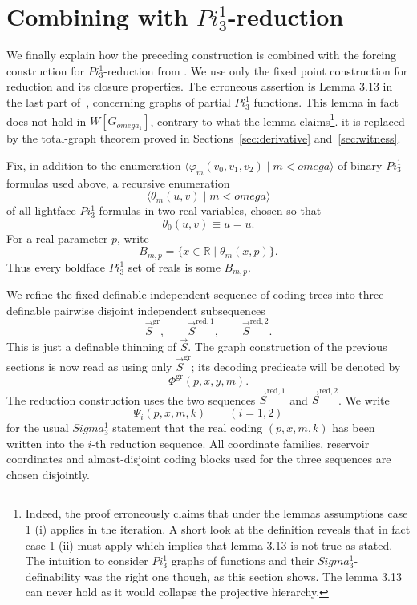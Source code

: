 \documentclass{article}
\theoremstyle{remark}
\theoremstyle{plain}
\newcommand{\Real}{\mathbb{R}}
\def\mathbf#1{#1}%
\def\Pi{Pi}%
\def\Sigma{Sigma}%
\def\omega{omega}%
\begin{document}
\section{Combining with \texorpdfstring{$\mathbf{\Pi}^1_3$}{Pi13}-reduction}\label{sec:reduction}
We finally explain how the preceding construction is combined with the forcing
construction for $\mathbf{\Pi}^1_3$-reduction from
\cite{HOFFELNER2023103292}. We use only the fixed point construction for
reduction and its closure properties. The erroneous assertion is Lemma 3.13 in the last part
of~\cite{HOFFELNER2023103292}, concerning graphs of partial
$\mathbf{\Pi}^1_3$ functions. This lemma in fact does not hold in $W[G_{\omega_1}]$, contrary to what the lemma claims\footnote{Indeed, the proof erroneously claims that under the lemmas assumptions  case 1 (i) applies in the iteration. A short look at the definition reveals that in fact case 1 (ii) must apply which implies that lemma 3.13 is not true as stated. The intuition to consider $\Pi^1_3$ graphs of functions and their $\Sigma^1_3$-definability was the right one though, as this section shows. The lemma 3.13 can never hold as it would collapse the projective hierarchy.}.   it is replaced by the
total-graph theorem proved in Sections~\ref{sec:derivative} and~\ref{sec:witness}.

Fix, in addition to the enumeration
$\langle\varphi_m(v_0,v_1,v_2)\mid m<\omega\rangle$ of binary
$\Pi^1_3$ formulas used above, a recursive enumeration
\[
   \langle\theta_m(u,v)\mid m<\omega\rangle
\]
of all lightface $\Pi^1_3$ formulas in two real variables, chosen so that
\[
   \theta_0(u,v)\equiv u=u.
\]
For a real parameter $p$, write
\[
   B_{m,p}=\{x\in\Real\mid \theta_m(x,p)\}.
\]
Thus every boldface $\mathbf{\Pi}^1_3$ set of reals is some $B_{m,p}$.

We refine the fixed definable independent sequence of coding trees into three
definable pairwise disjoint independent subsequences
\[
   \vec S^{\mathrm{gr}},\qquad
   \vec S^{\mathrm{red},1},\qquad
   \vec S^{\mathrm{red},2}.
\]
This is just a definable thinning of $\vec S$. The graph construction of the
previous sections is now read as using only $\vec S^{\mathrm{gr}}$; its decoding
predicate will be denoted by
\[
   \Phi^{\mathrm{gr}}(p,x,y,m).
\]
The reduction construction uses the two sequences
$\vec S^{\mathrm{red},1}$ and $\vec S^{\mathrm{red},2}$. We write
\[
   \Psi_i(p,x,m,k) \qquad (i=1,2)
\]
for the usual $\Sigma^1_3$ statement that the real coding $(p,x,m,k)$ has been
written into the $i$-th reduction sequence. All coordinate families, reservoir
coordinates and almost-disjoint coding blocks used for the three sequences are
chosen disjointly.
\end{document}
